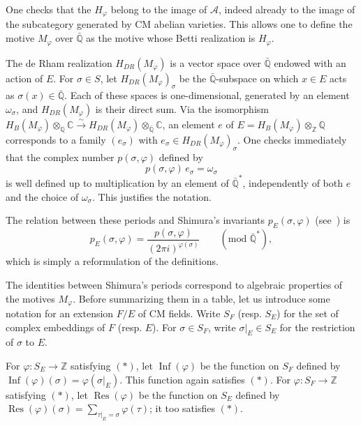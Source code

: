 \documentclass[11pt]{amsart}
\theoremstyle{definition}
\DeclareMathOperator{\Res}{Res}
\DeclareMathOperator{\Inf}{Inf}
\newcommand{\ZZ}{\mathbb{Z}}
\newcommand{\QQ}{\mathbb{Q}}
\newcommand{\CC}{\mathbb{C}}
\begin{document}
One checks that the $H_\varphi$ belong to the image of $\mathcal A$, indeed already to the image of the subcategory generated by CM abelian varieties. This allows one to define the motive $M_\varphi$ over $\bar{\QQ}$ as the motive whose Betti realization is $H_\varphi$.

The de Rham realization $H_{DR}(M_\varphi)$ is a vector space over $\bar{\QQ}$ endowed with an action of $E$. For $\sigma\in S$, let $H_{DR}(M_\varphi)_\sigma$ be the $\bar{\QQ}$-subspace on which $x\in E$ acts as $\sigma(x)\in \bar{\QQ}$. Each of these spaces is one-dimensional, generated by an element $\omega_\sigma$, and $H_{DR}(M_\varphi)$ is their direct sum. Via the isomorphism $H_B(M_\varphi)\otimes_\QQ\CC \xrightarrow{\sim} H_{DR}(M_\varphi)\otimes_{\bar{\QQ}}\CC$, an element $e$ of $E = H_B(M_\varphi)\otimes_\ZZ\QQ$ corresponds to a family $(e_\sigma)$ with $e_\sigma\in H_{DR}(M_\varphi)_\sigma$. One checks immediately that the complex number $p(\sigma,\varphi)$ defined by
\[
p(\sigma,\varphi)\, e_\sigma = \omega_\sigma
\]
is well defined up to multiplication by an element of $\bar{\QQ}^*$, independently of both $e$ and the choice of $\omega_\sigma$. This justifies the notation.

The relation between these periods and Shimura's invariants $p_E(\sigma,\varphi)$ (see~\cite{Shimura2}) is
\[
p_E(\sigma,\varphi)=\frac{p(\sigma,\varphi)}{(2\pi i)^{\varphi(\sigma)}}
\qquad (\text{mod }\bar{\QQ}^*),
\]
which is simply a reformulation of the definitions.

The identities between Shimura's periods correspond to algebraic properties of the motives $M_\varphi$. Before summarizing them in a table, let us introduce some notation for an extension $F/E$ of CM fields. Write $S_F$ (resp. $S_E$) for the set of complex embeddings of $F$ (resp. $E$). For $\sigma\in S_F$, write $\sigma|_E\in S_E$ for the restriction of $\sigma$ to $E$.

For $\varphi:S_E\to\ZZ$ satisfying $(*)$, let $\Inf(\varphi)$ be the function on $S_F$ defined by $\Inf(\varphi)(\sigma)=\varphi(\sigma|_E)$. This function again satisfies $(*)$. For $\varphi:S_F\to\ZZ$ satisfying $(*)$, let $\Res(\varphi)$ be the function on $S_E$ defined by $\Res(\varphi)(\sigma)=\sum_{\tau|_E=\sigma}\varphi(\tau)$; it too satisfies $(*)$.
\end{document}
